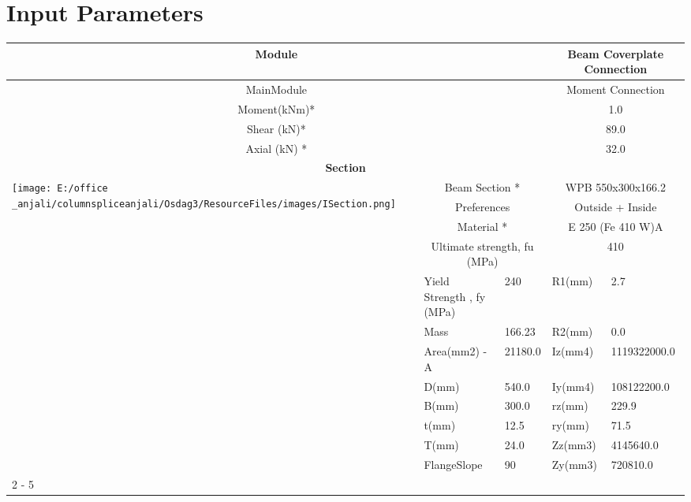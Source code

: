 \documentclass{article}%
\begin{document}
%
\normalsize%
\pagestyle{header}%
\section{Input Parameters}%
\label{sec:InputParameters}%
\renewcommand{\arraystretch}{1.2}%
\begin{longtable}{|p{5cm}|p{2cm}|p{2cm}|p{2cm}|p{5cm}|}%
\hline%
\hline%
\multicolumn{3}{|c|}{Module}&\multicolumn{2}{|c|}{Beam Coverplate Connection}\\%
\hline%
\hline%
\multicolumn{3}{|c|}{MainModule}&\multicolumn{2}{|c|}{Moment Connection}\\%
\hline%
\hline%
\multicolumn{3}{|c|}{Moment(kNm)*}&\multicolumn{2}{|c|}{1.0}\\%
\hline%
\hline%
\multicolumn{3}{|c|}{Shear (kN)*}&\multicolumn{2}{|c|}{89.0}\\%
\hline%
\hline%
\multicolumn{3}{|c|}{Axial (kN) *}&\multicolumn{2}{|c|}{32.0}\\%
\hline%
\hline%
\multicolumn{5}{|c|}{\textbf{Section}}\\%
\hline%
\hline%
\multirow{12}{*}{\texttt{[image: E:/office \_anjali/columnspliceanjali/Osdag3/ResourceFiles/images/ISection.png]}}&\multicolumn{2}{|c|}{Beam Section *}&\multicolumn{2}{|c|}{WPB 550x300x166.2}\\%
\cline{2%
-%
5}%
&\multicolumn{2}{|c|}{Preferences}&\multicolumn{2}{|c|}{Outside + Inside}\\%
\cline{2%
-%
5}%
&\multicolumn{2}{|c|}{Material *}&\multicolumn{2}{|c|}{E 250 (Fe 410 W)A}\\%
\cline{2%
-%
5}%
&\multicolumn{2}{|c|}{Ultimate strength, fu (MPa)}&\multicolumn{2}{|c|}{410}\\%
\cline{2%
-%
5}%
&Yield Strength , fy (MPa)&240&R1(mm)&2.7\\%
\cline{2%
-%
5}%
&Mass&166.23&R2(mm)&0.0\\%
\cline{2%
-%
5}%
&Area(mm2) {-} A&21180.0&Iz(mm4)&1119322000.0\\%
\cline{2%
-%
5}%
&D(mm)&540.0&Iy(mm4)&108122200.0\\%
\cline{2%
-%
5}%
&B(mm)&300.0&rz(mm)&229.9\\%
\cline{2%
-%
5}%
&t(mm)&12.5&ry(mm)&71.5\\%
\cline{2%
-%
5}%
&T(mm)&24.0&Zz(mm3)&4145640.0\\%
\cline{2%
-%
5}%
&FlangeSlope&90&Zy(mm3)&720810.0\\%
\cline{2%
-%
5}%
\hline%
\multicolumn{5}{|c|}{\textbf{Bolt Details}}\\%

\end{longtable}
\end{document}
